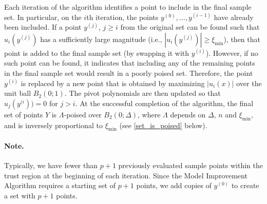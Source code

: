 Each iteration of the algorithm identifies a point to include in the final sample set.
In particular, on the $i$th iteration, the points $y^{(0)}, \ldots, y^{(i-1)}$ have already been included.   
If a point $y^{(j)}$,  $j \ge i$ from the original set can be found such that 
$u_i(y^{(j)})$ has a sufficiently large magnitude  (i.e.,  $|u_i(y^{(j)})| \ge \xi_{\min}$),  
then that point is added to the final sample set (by swapping it with $y^{(i)}$).
However, if no such point can be found, 
it indicates that including any of the remaining points in the final sample set would result in a poorly poised set.
Therefore, the point $y^{(i)}$ is replaced by a new point that is obtained by maximizing $|u_i(x)|$ 
over the unit ball $B_2(0;1)$.
The pivot polynomials are then updated so that 
$u_j(y^{(i})) = 0$ for $j > i$.
At the successful completion of the algorithm, the final set of points $Y$ is $\Lambda$-poised over $B_2(0;\Delta)$,
where $\Lambda$ depends on $\Delta$,  $n$ and $\xi_{\min}$,  and is inversely proportional to $\xi_{\min}$
(see \cref{set_is_poised} below).

\paragraph*{Note.}
Typically,  we have fewer than $p+1$ previously evaluated sample points within the trust region at the beginning of each iteration.
Since the Model Improvement Algorithm requires a starting set of $p+1$ points, 
we add copies of $y^{(0)}$ to create a set with $p+1$ points.

